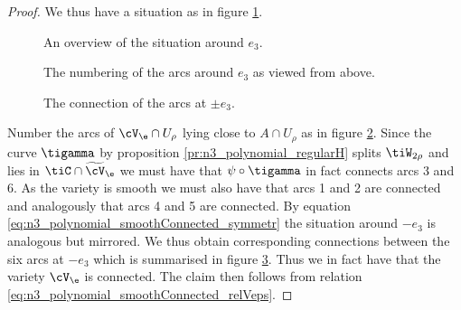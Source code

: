 \begin{proof}
  We thus have a situation as in figure \ref{fi:n3_polynomial_arcOverview}.
  \begin{figure}
    \centering
    
    \caption{An overview of the situation around $e_3$.}
    \label{fi:n3_polynomial_arcOverview}
  \end{figure}
  \begin{figure}
    \centering
    
    \caption{The numbering of the arcs around $e_3$ as viewed from above.}
    \label{fi:n3_polynomial_arcNumbering}
  \end{figure}
  \begin{figure}
    \centering
    
    \caption{The connection of the arcs at $\pm e_3$.}
    \label{fi:n3_polynomial_arcConnections}
  \end{figure}
  Number the arcs of $\cV_\e\cap U_\rho$ lying close to $A\cap U_\rho$ as in figure \ref{fi:n3_polynomial_arcNumbering}.
  Since the curve $\tigamma$ by proposition \ref{pr:n3_polynomial_regularH} splits $\tiW_{2\rho}$ and lies in $\tiC\cap\widetilde{\cV}_\e$ we must have that
  $\psi\circ\tigamma$ in fact connects arcs 3 and 6.
  As the variety is smooth we must also have that arcs 1 and 2 are connected
  and analogously that arcs 4 and 5 are connected.
  By equation \eqref{eq:n3_polynomial_smoothConnected_symmetr} the situation around $-e_3$ is analogous but mirrored.
  We thus obtain corresponding connections between the six arcs at $-e_3$ which is summarised in figure \ref{fi:n3_polynomial_arcConnections}.
  Thus we in fact have that the variety $\cV_\e$ is connected.
  The claim then follows from relation \eqref{eq:n3_polynomial_smoothConnected_relVeps}.
\end{proof}

